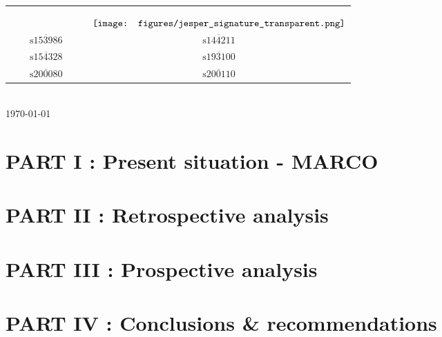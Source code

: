 \documentclass[12pt]{article}
\begin{document}
\begin{titlepage}
{
}


\begin{tabular}{cc}
$\qquad$ \qquad& \hspace{0.5cm} $\raisebox{-\totalheight}{\texttt{[image: figures/jesper\_signature\_transparent.png]}}$ \\ 
 $\overline{\qquad\text{s153986}\qquad}$ \quad& \quad $\overline{ \qquad\text{s144211}\qquad}$ \\ [1cm]
 $\overline{\qquad\text{s154328}\qquad}$ \quad& \quad $\overline{\qquad\text{s193100}\qquad}$ \\[1cm]
  $\overline{\qquad\text{s200080}\qquad}$ \quad& \quad $\overline{\qquad\text{s200110}\qquad}$ \\
\end{tabular}\\[1cm]

{\small
\today %
}
\\[0.2cm] %



\end{titlepage}

\newpage
\tableofcontents

\newpage
\section{PART I : Present situation - MARCO}



\section{PART II : Retrospective analysis}



\section{PART III : Prospective analysis}



\section{PART IV : Conclusions \& recommendations}





\end{document}
